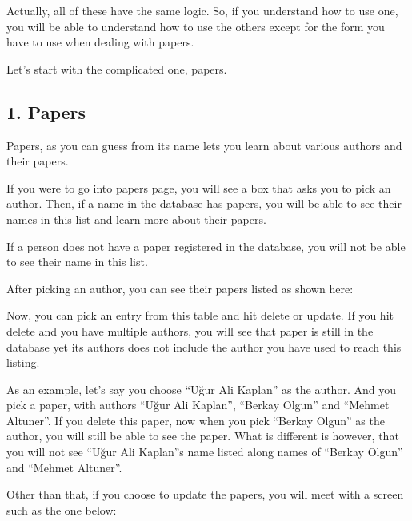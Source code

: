 \documentclass[letterpaper,10pt,english]{sphinxmanual}
\begin{document}
Actually, all of these have the same logic. So, if you understand how
to use one, you will be able to understand how to use the others except
for the form you have to use when dealing with papers.

Let’s start with the complicated one, papers.


\subsection{1. Papers}
\label{\detokenize{user/kaplan:papers}}
Papers, as you can guess from its name lets you learn about various
authors and their papers.

If you were to go into papers page, you will see a box that asks you
to pick an author. Then, if a name in the database has papers, you will
be able to see their names in this list and learn more about their papers.

\begin{figure}[htbp]
\centering

\noindent{}
\end{figure}

If a person does not have a paper registered in the database, you will not
be able to see their name in this list.

After picking an author, you can see their papers listed as shown here:

\begin{figure}[htbp]
\centering

\noindent{}
\end{figure}

Now, you can pick an entry from this table and hit delete or update. If you
hit delete and you have multiple authors, you will see that paper is still in
the database yet its authors does not include the author you have used to
reach this listing.

As an example, let’s say you choose “Uğur Ali Kaplan” as the author. And you
pick a paper, with authors “Uğur Ali Kaplan”, “Berkay Olgun” and “Mehmet Altuner”.
If you delete this paper, now when you pick “Berkay Olgun” as the author, you will
still be able to see the paper. What is different is however, that you will not
see “Uğur Ali Kaplan”s name listed along names of “Berkay Olgun” and “Mehmet Altuner”.

Other than that, if you choose to update the papers, you will meet with a screen
such as the one below:
\end{document}
